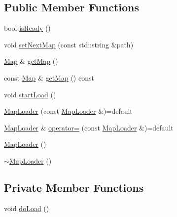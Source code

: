 \subsection*{Public Member Functions}
\begin{DoxyCompactItemize}
\item 
bool \hyperlink{classZeta_1_1MapLoader_aa6ee7e9a20549f3194a8da7468557110}{is\+Ready} ()
\item 
void \hyperlink{classZeta_1_1MapLoader_a2d7fc7a07f9f84fe9fb183dbff398cba}{set\+Next\+Map} (const std\+::string \&path)
\item 
\hyperlink{classZeta_1_1Map}{Map} \& \hyperlink{classZeta_1_1MapLoader_a2ea1f933cf25da59ccbb44e9c7aed53c}{get\+Map} ()
\item 
const \hyperlink{classZeta_1_1Map}{Map} \& \hyperlink{classZeta_1_1MapLoader_a1b4e5462b6759e3f7f596bb701dde344}{get\+Map} () const 
\item 
void \hyperlink{classZeta_1_1MapLoader_aff6fbb30b6b07da75660f7dd83666166}{start\+Load} ()
\item 
\hyperlink{classZeta_1_1MapLoader_a2c401d8dc802d29fb004ff6c7d76aa40}{Map\+Loader} (const \hyperlink{classZeta_1_1MapLoader}{Map\+Loader} \&)=default
\item 
\hyperlink{classZeta_1_1MapLoader}{Map\+Loader} \& \hyperlink{classZeta_1_1MapLoader_a5f075ad707bd7f9115fa0af1c1c76efa}{operator=} (const \hyperlink{classZeta_1_1MapLoader}{Map\+Loader} \&)=default
\item 
\hyperlink{classZeta_1_1MapLoader_abac0cf1f6843a3dccfde587e466f68b2}{Map\+Loader} ()
\item 
\hyperlink{classZeta_1_1MapLoader_a517c96723adf19ebca92ce02c86ebed4}{$\sim$\+Map\+Loader} ()
\end{DoxyCompactItemize}
\subsection*{Private Member Functions}
\begin{DoxyCompactItemize}
\item 
void \hyperlink{classZeta_1_1MapLoader_a8a8e0f178ee827813c0595df6471d246}{do\+Load} ()
\end{DoxyCompactItemize}
